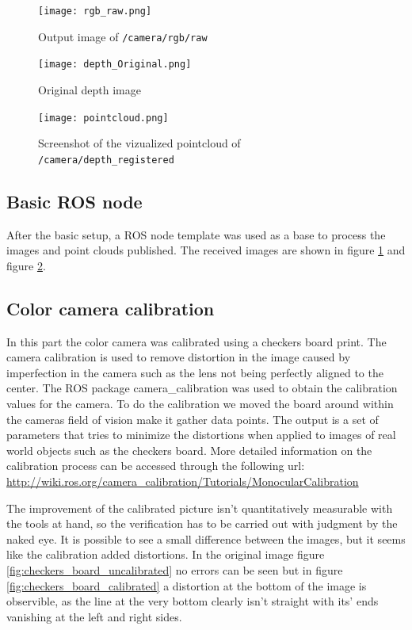 \documentclass[DIV12,a4paper]{scrartcl}
\begin{document}
\begin{figure}
  \centering
  \texttt{[image: rgb\_raw.png]}
  \caption{Output image of \texttt{/camera/rgb/raw}}
  \label{fig:rgb-raw}
\end{figure}


\begin{figure}[h!tbp]
  \centering
  \texttt{[image: depth\_Original.png]}
  \caption{Original depth image}
  \label{fig:original_depth}
\end{figure}

\begin{figure}[h!tbp]
  \centering
  \texttt{[image: pointcloud.png]}
  \caption{Screenshot of the vizualized pointcloud of \texttt{/camera/depth\_registered}}
  \label{fig:depth_registered}
\end{figure}

\subsection{Basic ROS node}
\label{sec:basic-ros}
After the basic setup, a ROS node template was used as a base to process the images and point clouds published. The received images are shown in figure \ref{fig:rgb-raw} and figure \ref{fig:original_depth}.
\subsection{Color camera calibration}
\label{sec:calibration}
In this part the color camera was calibrated using a checkers board print. The camera calibration is used to remove distortion in the image caused by imperfection in the camera such as the lens not being perfectly aligned to the center. The ROS package camera\_calibration was used to obtain the calibration values for the camera. To do the calibration we moved the board around within the cameras field of vision make it gather data points. The output is a set of parameters that tries to minimize the distortions when applied to images of real world objects such as the checkers board. More detailed information on the calibration process can be accessed through the following url: \url{http://wiki.ros.org/camera_calibration/Tutorials/MonocularCalibration}
\par
The improvement of the calibrated picture isn't quantitatively measurable with the tools at hand, so the verification has to be carried out with judgment by the naked eye. It is possible to see a small difference between the images, but it seems like the calibration added distortions. In the original image figure \ref{fig:checkers_board_uncalibrated} no errors can be seen but in figure \ref{fig:checkers_board_calibrated} a distortion at the bottom of the image is observible, as the line at the very bottom clearly isn't straight with its' ends vanishing at the left and right sides.
\end{document}
